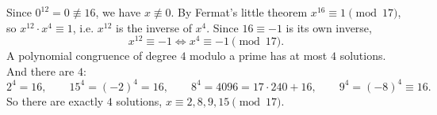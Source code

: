 Since $0^{12}=0\not\equiv16$, we have $x\not\equiv0$. By Fermat's little theorem $x^{16}\equiv1\pmod{17}$, so $x^{12}\cdot x^4\equiv1$, i.e. $x^{12}$ is the inverse of $x^4$. Since $16\equiv-1$ is its own inverse,
\[x^{12}\equiv-1\iff x^4\equiv-1\pmod{17}.\]
A polynomial congruence of degree $4$ modulo a prime has at most $4$ solutions. And there are $4$:
\[2^4=16,\qquad 15^4=(-2)^4=16,\qquad 8^4=4096=17\cdot240+16,\qquad 9^4=(-8)^4\equiv16.\]
So there are exactly $\boxed{4}$ solutions, $x\equiv2,8,9,15\pmod{17}$.
